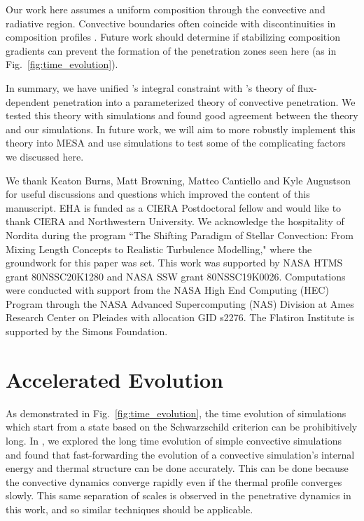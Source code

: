 \documentclass[twocolumn]{aastex631}
\begin{document}
Our work here assumes a uniform composition through the convective and radiative region.
Convective boundaries often coincide with discontinuities in composition profiles \citep{salaris_cassisi_2017}.
Future work should determine if stabilizing composition gradients can prevent the formation of the penetration zones seen here (as in Fig.~\ref{fig:time_evolution}).

In summary, we have unified \citet{roxburgh1989}'s integral constraint with \citet{zahn1991}'s theory of flux-dependent penetration into a parameterized theory of convective penetration.
We tested this theory with simulations and found good agreement between the theory and our simulations.
In future work, we will aim to more robustly implement this theory into MESA and use simulations to test some of the complicating factors we discussed here.



\begin{acknowledgments}
We thank Keaton Burns, Matt Browning, Matteo Cantiello and Kyle Augustson for useful discussions and questions which improved the content of this manuscript.
EHA is funded as a CIERA Postdoctoral fellow and would like to thank CIERA and Northwestern University. 
We acknowledge the hospitality of Nordita during the program ``The Shifting Paradigm of Stellar Convection: From Mixing Length Concepts to Realistic Turbulence Modelling," where the groundwork for this paper was set.
This work was supported by NASA HTMS grant 80NSSC20K1280 and NASA SSW grant 80NSSC19K0026.
Computations were conducted with support from the NASA High End Computing (HEC) Program through the NASA Advanced Supercomputing (NAS) Division at Ames Research Center on Pleiades with allocation GID s2276.
The Flatiron Institute is supported by the Simons Foundation.
\end{acknowledgments}


\appendix

\section{Accelerated Evolution}
\label{app:accelerated_evolution}
As demonstrated in Fig.~\ref{fig:time_evolution}, the time evolution of simulations which start from a state based on the Schwarzschild criterion can be prohibitively long.
In \citet{anders_etal_2018}, we explored the long time evolution of simple convective simulations and found that fast-forwarding the evolution of a convective simulation's internal energy and thermal structure can be done accurately.
This can be done because the convective dynamics converge rapidly even if the thermal profile converges slowly.
This same separation of scales is observed in the penetrative dynamics in this work, and so similar techniques should be applicable.
\end{document}

